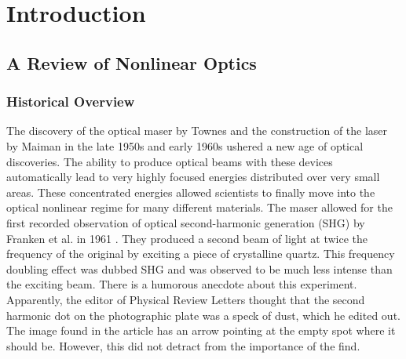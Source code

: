 \chapter{Introduction}\label{chap:intro}
\partialtoc



\section{A Review of Nonlinear Optics}



\subsection{Historical Overview}\label{chap_theory_hist}

The discovery of the optical maser by Townes \cite{PhysRev.112.1940} and the
construction of the laser by Maiman in the late 1950s and early 1960s ushered a
new age of optical discoveries. The ability to produce optical beams with these
devices automatically lead to very highly focused energies distributed over very
small areas. These concentrated energies allowed scientists to finally move into
the optical nonlinear regime for many different materials. The maser allowed for
the first recorded observation of optical second-harmonic generation (SHG) by
Franken et al. in 1961 \cite{PhysRevLett.7.118}. They produced a second beam of
light at twice the frequency of the original by exciting a piece of crystalline
quartz. This frequency doubling effect was dubbed SHG and was observed to be
much less intense than the exciting beam. There is a humorous anecdote about
this experiment. Apparently, the editor of Physical Review Letters thought that
the second harmonic dot on the photographic plate was a speck of dust, which he
edited out. The image found in the article has an arrow pointing at the empty
spot where it should be. However, this did not detract from the importance of
the find.

